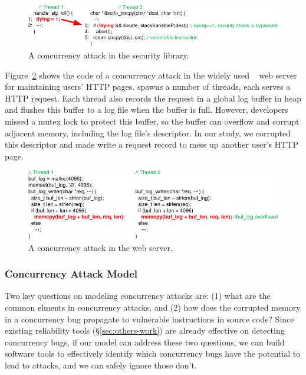 \begin{figure}[h]
\vspace{-.1in}
\centering
\includegraphics[width=0.8\columnwidth]{figures/libsafe}
\vspace{-.1in}
\caption{{A concurrency attack in the \libsafe security library.}} 
\label{fig:libsafe}
\vspace{-.15in}
\end{figure}

Figure~\ref{fig:apache} shows the code of a concurrency attack in 
the widely used \apache~\cite{apache} web server for maintaining users' HTTP 
pages. \apache spawns a number of threads, each serves a HTTP request. Each 
thread also records the request in a global log buffer in heap and flushes this 
buffer to a log file when the buffer is full. However, developers missed a 
mutex lock to protect this buffer, so the buffer can overflow and corrupt 
adjacent memory, including the log file's descriptor. In our study, we 
corrupted this descriptor and made \apache write a request record to mess up 
another user's HTTP page.

\begin{figure}[h]
\vspace{-.05in}
\centering
\includegraphics[width=0.8\columnwidth]{figures/apache}
\vspace{-.1in}
\caption{{A concurrency attack in the \apache web server.}} \label{fig:apache}
\vspace{-.15in}
\end{figure}



\vspace{-.15in}\subsubsection{Concurrency Attack Model} 
\label{sec:attack-phase}\vspace{-.075in}

Two key questions on modeling concurrency attacks are: (1) what are the common 
elments in concurrency attacks, and (2) how does the corrupted memory in a 
concurrency bug propagate to vulnerable instructions in source code? Since 
existing reliability tools (\S\ref{sec:others-work}) are already effective on 
detecting concurrency bugs, if our model can address these two questions, we 
can build software tools to effectively identify which concurrency bugs have 
the potential to lead to attacks, and we can safely ignore those don't.

